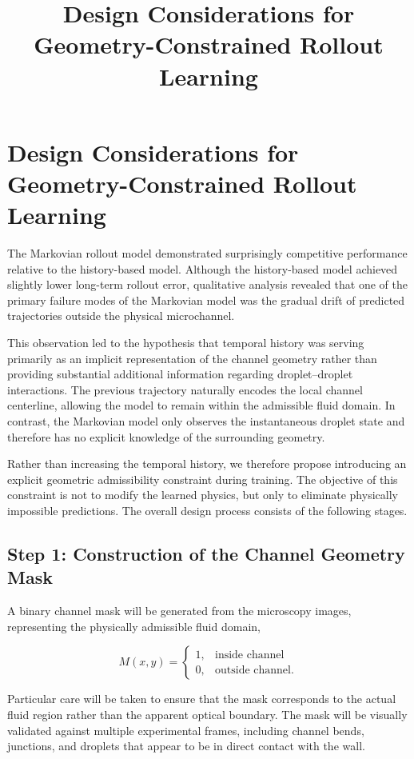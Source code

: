 \documentclass[11pt]{article}
\title{Design Considerations for Geometry-Constrained Rollout Learning}
\author{}
\date{}
\begin{document}
\maketitle

\section{Design Considerations for Geometry-Constrained Rollout Learning}

The Markovian rollout model demonstrated surprisingly competitive performance relative to the history-based model. Although the history-based model achieved slightly lower long-term rollout error, qualitative analysis revealed that one of the primary failure modes of the Markovian model was the gradual drift of predicted trajectories outside the physical microchannel.

This observation led to the hypothesis that temporal history was serving primarily as an implicit representation of the channel geometry rather than providing substantial additional information regarding droplet--droplet interactions. The previous trajectory naturally encodes the local channel centerline, allowing the model to remain within the admissible fluid domain. In contrast, the Markovian model only observes the instantaneous droplet state and therefore has no explicit knowledge of the surrounding geometry.

Rather than increasing the temporal history, we therefore propose introducing an explicit geometric admissibility constraint during training. The objective of this constraint is not to modify the learned physics, but only to eliminate physically impossible predictions. The overall design process consists of the following stages.

\subsection{Step 1: Construction of the Channel Geometry Mask}

A binary channel mask will be generated from the microscopy images, representing the physically admissible fluid domain,

\[
M(x,y)=
\begin{cases}
1,&\text{inside channel}\\
0,&\text{outside channel}.
\end{cases}
\]

Particular care will be taken to ensure that the mask corresponds to the actual fluid region rather than the apparent optical boundary. The mask will be visually validated against multiple experimental frames, including channel bends, junctions, and droplets that appear to be in direct contact with the wall.
\end{document}
